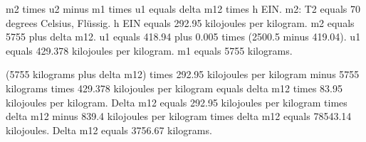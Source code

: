 m2 times u2 minus m1 times u1 equals delta m12 times h EIN.  
m2: T2 equals 70 degrees Celsius, Flüssig.  
h EIN equals 292.95 kilojoules per kilogram.  
m2 equals 5755 plus delta m12.  
u1 equals 418.94 plus 0.005 times (2500.5 minus 419.04).  
u1 equals 429.378 kilojoules per kilogram.  
m1 equals 5755 kilograms.  

(5755 kilograms plus delta m12) times 292.95 kilojoules per kilogram minus 5755 kilograms times 429.378 kilojoules per kilogram equals delta m12 times 83.95 kilojoules per kilogram.  
Delta m12 equals 292.95 kilojoules per kilogram times delta m12 minus 839.4 kilojoules per kilogram times delta m12 equals 78543.14 kilojoules.  
Delta m12 equals 3756.67 kilograms.